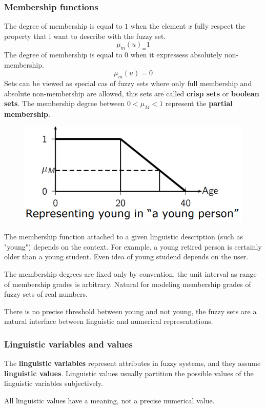 \documentclass{article}
\begin{document}
\subsubsection{Membership functions}
The degree of membership is equal to $1$ when the element $x$ fully respect the property
that i want to describe with the fuzzy set.
$$\mu_m(u)_=1$$
The degree of membership is equal to $0$ when it expressess absolutely non-membership.
$$\mu_m(u)=0$$
Sets can be viewed as special cas of fuzzy sets where only full membership and absolute
non-membership are allowed, this sets are called \textbf{crisp sets} or \textbf{boolean sets}.
The membership degree between $0 < \mu_M <1$ represent the \textbf{partial membership}.
\begin{figure}[H]
    \centering
    \includegraphics[scale=0.5]{images/young.png}
\end{figure}
The membership function attached to a given linguistic description (such as "young") depends
on the context. For example, a young retired person is certainly older than a young student.
Even idea of young studend depends on the user.

The membership degrees are fixed only by convention, the unit interval as range of membership
grades is arbitrary. Natural for modeling membership grades of fuzzy sets of real numbers.

There is no precise threshold between young and not young, the fuzzy sets are a natural
interface between linguistic and numerical representations.
\subsubsection{Linguistic variables and values}
The \textbf{linguistic variables} represent attributes in fuzzy systems, and they assume
\textbf{linguistic values}. Linguistic values usually partition the possible values of the
linguistic variables subjectively.

All linguistic values have a meaning, not a precise numerical value.
\end{document}
